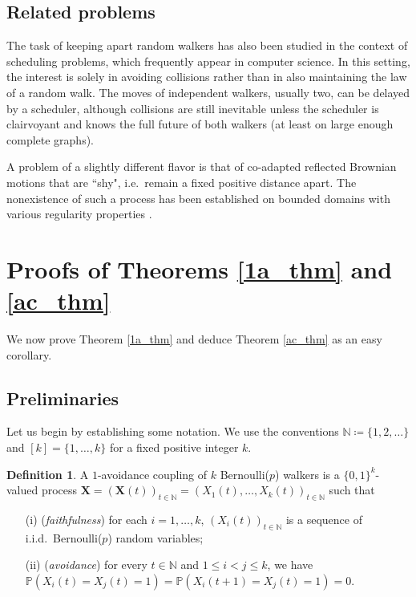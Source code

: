 \documentclass[11pt,reqno]{amsart} %
\numberwithin{equation}{section}
\newcommand{\N}{\mathbb{N}}
\renewcommand{\P}{\mathbb{P}}
\theoremstyle{definition}
\newtheorem{defn}[thm]{Definition}
\newcommand{\vc}[1]{{\mathbf #1}}
\begin{document}
\subsection{Related problems} \label{related}
The task of keeping apart random walkers has also been studied in the context of scheduling problems, which frequently appear in computer science.
In this setting, the interest is solely in avoiding collisions rather than in also maintaining the law of a random walk. 
The moves of independent walkers, usually two, can be delayed by a scheduler, although collisions are still inevitable \cite{coppersmith-tetali-winkler93,tetali-winkler93} unless the scheduler is clairvoyant and knows the full future of both walkers \cite{winkler00,balister-bollobas-stacey00,gacs11,basu-sidoravicius-sly??} (at least on large enough complete graphs).

A problem of a slightly different flavor is that of co-adapted reflected Brownian motions that are ``shy", i.e.~remain a fixed positive distance apart.
The nonexistence of such a process has been established on bounded domains with various regularity properties \cite{bejamini-burdzy-chen06,kendall09,bramson-burdzy-kendall13,bramson-burdzy-kendall14}.


\section{Proofs of Theorems \ref{1a_thm} and \ref{ac_thm}} \label{proofs}
We now prove Theorem \ref{1a_thm} and deduce Theorem \ref{ac_thm} as an easy corollary.

\subsection{Preliminaries} \label{preliminaries}
Let us begin by establishing some notation.
We use the conventions $\N \coloneqq \{1,2,\dots\}$ and $[k] = \{1,\dots,k\}$ for a fixed positive integer $k$.

\begin{defn}
A $1$-avoidance coupling of $k$ Bernoulli($p$) walkers is a $\{0,1\}^k$-valued process $\vc X = (\vc X(t))_{t\in\N} = (X_1(t),\dots,X_k(t))_{t\in\N}$ such that
\begin{itemize}
\item[(i)] (\textit{faithfulness}) for each $i = 1,\dots,k$, $(X_i(t))_{t\in\N}$ is a sequence of i.i.d.~Bernoulli($p$) random variables;
\item[(ii)] (\textit{avoidance}) for every $t \in \N$ and $1 \leq i < j \leq k$, we have $\P(X_i(t) = X_j(t) = 1) = \P(X_{i}(t+1) = X_j(t) = 1) = 0$.
\end{itemize}
\end{defn}
\end{document}
